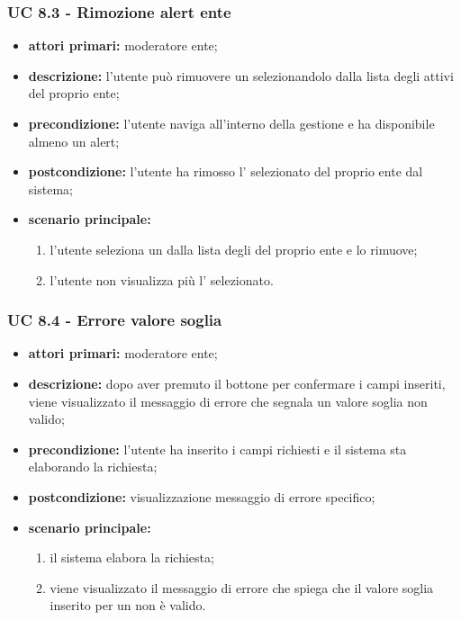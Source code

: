 			\subsubsection{UC 8.3 - Rimozione alert ente}
			\begin{itemize}
				\item \textbf{attori primari:} moderatore ente;
				\item \textbf{descrizione:} l'utente può rimuovere un  selezionandolo dalla lista degli  attivi del proprio ente;
				\item \textbf{precondizione:} l'utente naviga all'interno della gestione  e ha disponibile almeno un alert;
				\item \textbf{postcondizione:} l'utente ha rimosso l' selezionato del proprio ente dal sistema;
				\item \textbf{scenario principale:}
				\begin{enumerate}
					\item{l'utente seleziona un  dalla lista degli  del proprio ente e lo rimuove;}
					\item{l'utente non visualizza più l' selezionato.}
				\end{enumerate}
			\end{itemize}

			\subsubsection{UC 8.4 - Errore valore soglia}
			\begin{itemize}
				\item \textbf{attori primari:} moderatore ente;
				\item \textbf{descrizione:} dopo aver premuto il bottone per confermare i campi inseriti, viene visualizzato il messaggio di errore che segnala un valore soglia non valido;
				\item \textbf{precondizione:} l'utente ha inserito i campi richiesti e il sistema sta elaborando la richiesta;
				\item \textbf{postcondizione:} visualizzazione messaggio di errore specifico;
				\item \textbf{scenario principale:}
				\begin{enumerate}
					\item{il sistema elabora la richiesta;}
					\item{viene visualizzato il messaggio di errore che spiega che il valore soglia inserito per un  non è valido.}
				\end{enumerate}
			\end{itemize}

